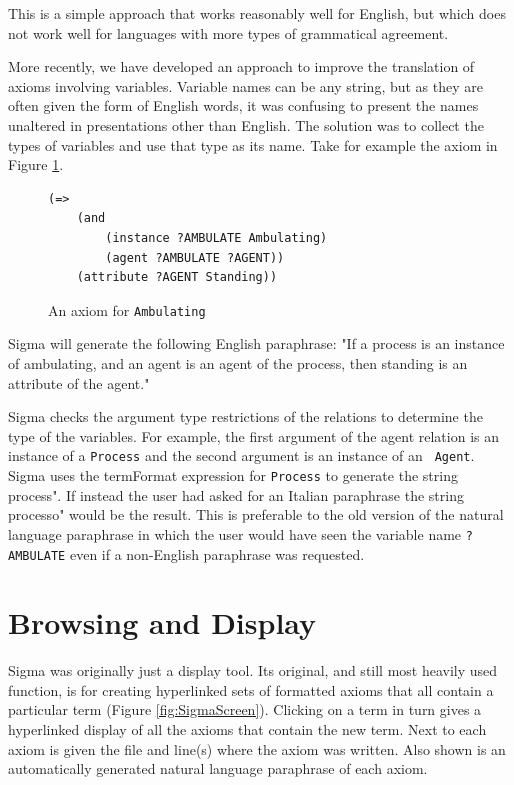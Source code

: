 \documentclass{book}
\begin{document}
This is a simple approach that works reasonably well for English, but which does
not work well for languages with more types of grammatical agreement.

More recently, we have developed an approach to improve the translation of
axioms involving variables.  Variable names can be any string, but as they are
often given the form of English words, it was confusing to present the names
unaltered in presentations other than English. The solution was to collect the
types of variables and use that type as its name.  Take for example the axiom in
Figure \ref{fig:Ambulating}.

\begin{figure}
\begin{framed}
\begin{verbatim}
(=>
    (and
        (instance ?AMBULATE Ambulating)
        (agent ?AMBULATE ?AGENT))
    (attribute ?AGENT Standing))
\end{verbatim}
\caption{An axiom for {\tt Ambulating}}
\label{fig:Ambulating}
\end{framed}
\end{figure}

Sigma will generate the following English paraphrase: "If a process is an
instance of ambulating, and an agent is an agent of the process, then standing
is an attribute of the agent."

Sigma checks the argument type restrictions of the relations to determine the
type of the variables.  For example, the first argument of the agent relation is
an instance of a {\tt Process} and the second argument is an instance of an {\tt
Agent}. Sigma uses the termFormat expression for {\tt Process} to generate the
string process".  If instead the user had asked for an Italian paraphrase the
string processo" would be the result.  This is preferable to the old version of
the natural language paraphrase in which the user would have seen the variable
name {\tt ?AMBULATE} even if a non-English paraphrase was requested.

\section{Browsing and Display}
\label{chap:KnowEngi:sec:Brow}

Sigma was originally just a display tool. Its original, and still most heavily
used function, is for creating hyperlinked sets of formatted axioms that all
contain a particular term (Figure \ref{fig:SigmaScreen}). Clicking on a term in
turn gives a hyperlinked display of all the axioms that contain the new term.
Next to each axiom is given the file and line(s) where the axiom was written.
Also shown is an automatically generated natural language paraphrase of each
axiom.
\end{document}
